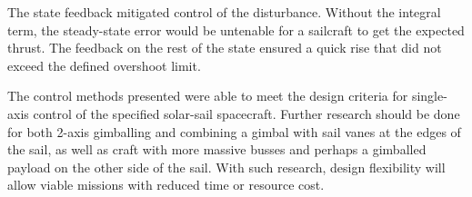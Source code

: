 \documentclass[]{aiaa-tc}%
\begin{document}
	The state feedback mitigated control of the disturbance. Without the integral term, the steady-state error would be untenable for a sailcraft to get the expected thrust.  The feedback on the rest of the state ensured a quick rise that did not exceed the defined overshoot limit.

	\vspace{5 mm}

	The control methods presented were able to meet the design criteria for single-axis control of the specified solar-sail spacecraft. Further research should be done for both 2-axis gimballing and combining a gimbal with sail vanes at the edges of the sail, as well as craft with more massive busses and perhaps a gimballed payload on the other side of the sail. With such research, design flexibility will allow viable missions with reduced time or resource cost.



%    
    
%    
%    
%    
%
%
%
%
	
\end{document}
